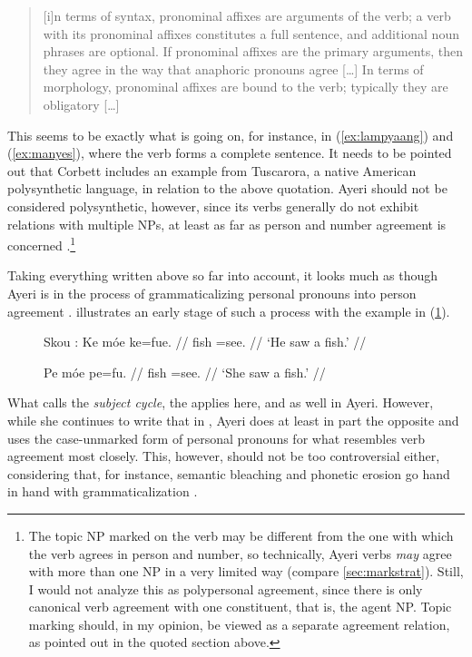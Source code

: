 \blockcquote[99--100]{corbett2006}{[i]n terms of syntax, pronominal affixes are
arguments of the verb; a verb with its pronominal affixes constitutes a full
sentence, and additional noun phrases are optional. If pronominal affixes are
the primary arguments, then they agree in the way that anaphoric pronouns agree
[…] In terms of morphology, pronominal affixes are bound to the verb; typically
they are obligatory […]}

\noindent This seems to be exactly what is going on, for instance, in
(\ref{ex:lampyaang}) and (\ref{ex:manyes}), where the verb forms a complete
sentence. It needs to be pointed out that Corbett includes an example from
Tuscarora, a native American polysynthetic language, in relation to the above
quotation. Ayeri should not be considered polysynthetic, however, since its
verbs generally do not exhibit relations with multiple NPs, at least as far as
person and number agreement is concerned
\citep[45--46]{comrie1989}.\footnote{The topic NP marked on the verb may be
different from the one with which the verb agrees in person and number, so
technically, Ayeri verbs \emph{may} agree with more than one NP in a very
limited way (compare \autoref{sec:markstrat}). Still, I would not analyze this
as polypersonal agreement, since there is only canonical verb agreement with
one constituent, that is, the agent NP. Topic marking should, in my opinion, be
viewed as a separate agreement relation, as pointed out in the quoted section
above.}

Taking everything written above so far into account, it looks much as though
Ayeri is in the process of grammaticalizing personal pronouns into person
agreement \parencites[42--45]{lehmann2015}[493--497]{vangelderen2011}.
\citet{corbett2006} illustrates an early stage of such a process with the
example in (\ref{ex:agrgen}).

\begin{figure}[h]
\pex\label{ex:agrgen}%
Skou \parencite[76--77]{corbett2006}:
\a\begingl
	\gla Ke móe ke=fue.  //
	\glb \TsgM{} fish \TsgM{}=​see.\TsgM{} {} //
	\glft `He saw a fish.' //
\endgl

\a\begingl
	\gla Pe móe pe=fu.  //
	\glb \TsgF{} fish \TsgF{}=​see.\TsgF{} {} //
	\glft `She saw a fish.' //
\endgl
\xe
\end{figure}

What \citet{vangelderen2011} calls the \emph{subject cycle}, the
 applies here, and as well in
Ayeri. However, while she continues to write that in
, Ayeri does at least in
part the opposite and uses the case-unmarked form of personal pronouns for
what resembles verb agreement most closely. This, however, should not be too
controversial either, considering that, for instance, semantic bleaching and
phonetic erosion go hand in hand with grammaticalization 
\parencites[136--137]{lehmann2015}[497]{vangelderen2011}.

